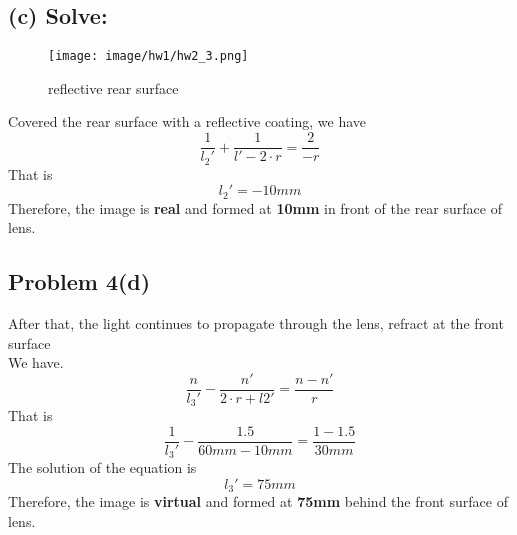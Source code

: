 \documentclass{article}
\begin{document}
\subsection{(c) Solve:}
\begin{figure}[H]
    \centering
    \texttt{[image: image/hw1/hw2\_3.png]}
    \caption{reflective rear surface}
    \label{fig:hw1_2}
\end{figure}
Covered the rear surface with a reflective coating, we have
\begin{equation}
    \frac{1}{l_2'}+\frac{1}{l'-2\cdot r}=\frac{2}{-r}
\end{equation}
That is
\begin{equation}
    \boxed{l_2'= -10mm}
\end{equation}
Therefore, the image is \textbf{real} and formed at \textbf{10mm} in front of the rear surface of lens.\\
\subsection{Problem 4(d)}
After that, the light continues to propagate through the lens, refract at the front surface\\
We have.
\begin{equation}
    \frac{n}{l_3'}-\frac{n'}{2\cdot r+l2'}=\frac{n-n'}{r}
\end{equation}
That is
\begin{equation}
    \frac{1}{l_3'}-\frac{1.5}{60mm-10mm}=\frac{1-1.5}{30mm}
\end{equation}
The solution of the equation is
\begin{equation}
    \boxed{l_3' = 75mm}
\end{equation}
Therefore, the image is \textbf{virtual} and formed at \textbf{75mm} behind the front surface of lens.\\
\end{document}

